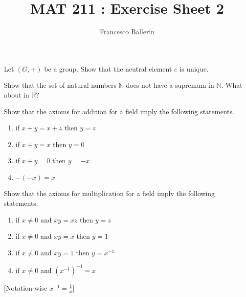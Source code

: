 \documentclass[11pt]{article}%
\title{MAT 211 : Exercise Sheet 2}
\author{Francesco Ballerin}
\date{\color{gray}{\small{francesco.ballerin@uib.no}}}
\newcommand{\N}{\mathbb{N}}
\begin{document}
\begin{minipage}[t]{\dimexpr \textwidth-6cm-\columnsep}
     \maketitle
\end{minipage}
\hfill\noindent{}

\vspace{50pt}

\begin{Exercise}[title=*$\dagger$]
	Let $(G,+)$ be a group. Show that the neutral element $e$ is unique.
\end{Exercise}	

\begin{Exercise}[title=*]
	Show that the set of natural numbers $\mathbb N$ does not have a supremum in $\N$. What about in $\mathbb R$?
\end{Exercise}

\begin{Exercise}[title=*]
	Show that the axioms for addition for a field imply the following statements.
	\begin{enumerate}[label={\alph*)}]
		\item if $x+y=x+z$ then $y=z$
		\item if $x+y=x$ then $y=0$
		\item if $x+y=0$ then $y=-x$
		\item $-(-x)=x$
	\end{enumerate}
\end{Exercise}

\begin{Exercise}[title=*]
	Show that the axioms for multiplication for a field imply the following statements.
	\begin{enumerate}[label={\alph*)}]
		\item if $x\neq0$ and $xy=xz$ then $y=z$
		\item if $x\neq0$ and $xy=x$ then $y=1$
		\item if $x\neq0$ and $xy=1$ then $y=x^{-1}$
		\item if $x\neq0$ and $(x^{-1})^{-1}=x$
	\end{enumerate}
	[Notation-wise $x^{-1}=\frac{1}{x}$]
\end{Exercise}
\end{document}
